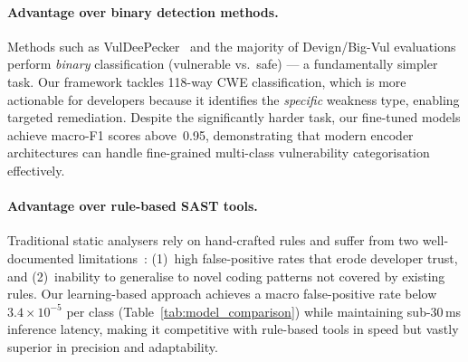 \paragraph{Advantage over binary detection methods.}
Methods such as VulDeePecker~\cite{li2018vuldeepecker} and the majority
of Devign/Big-Vul evaluations perform \emph{binary} classification
(vulnerable vs.\ safe) --- a fundamentally simpler task.  Our framework
tackles 118-way CWE classification, which is more actionable for
developers because it identifies the \emph{specific} weakness type,
enabling targeted remediation.  Despite the significantly harder task,
our fine-tuned models achieve macro-F1 scores above~0.95, demonstrating
that modern encoder architectures can handle fine-grained
multi-class vulnerability categorisation effectively.

\paragraph{Advantage over rule-based SAST tools.}
Traditional static analysers rely on hand-crafted rules and suffer from
two well-documented limitations~\cite{johnson2013why}: (1)~high
false-positive rates that erode developer trust, and (2)~inability to
generalise to novel coding patterns not covered by existing rules.  Our
learning-based approach achieves a macro false-positive rate below
$3.4 \times 10^{-5}$ per class (Table~\ref{tab:model_comparison}) while
maintaining sub-30\,ms inference latency, making it competitive with
rule-based tools in speed but vastly superior in precision and
adaptability.


